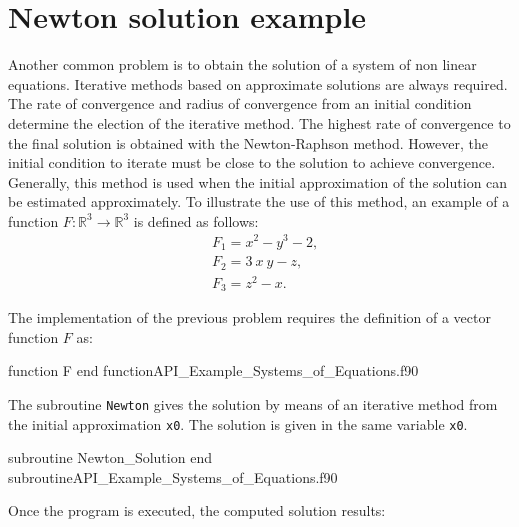     

    
\section{Newton solution example} 
    
    Another common problem is to obtain the solution of a system of  non linear equations. 
    Iterative methods based on approximate solutions are always required. The rate of convergence and radius of convergence from an initial condition determine the election of the iterative method. The highest rate of convergence to the final solution is obtained with the Newton-Raphson method. However, the initial condition to iterate must be  close to the solution to achieve convergence. Generally, this method is used when the initial approximation of the  solution can be estimated approximately. 
     To illustrate the use of this method,  an example of a  function ${F}:\mathbb{R}^3 \rightarrow \mathbb{R}^3$ is defined as follows:
    \begin{align*}
    &	F_1 = x^2 - y^3 - 2,\\
    &   F_2 = 3 \ x \ y - z,\\
    &   F_3 = z^2 -x.
    \end{align*}
    
    The implementation of the previous problem requires the definition of a vector function $F$ as:
   
    \vspace{0.5cm} 
    {function F}
    {end function}{API_Example_Systems_of_Equations.f90}
    
    The subroutine \verb|Newton|  gives the solution by means of an iterative method from the  initial approximation \verb|x0|.
    The solution is given in the same variable  \verb|x0|. 

    
    \vspace{0.5cm} 
    {subroutine Newton_Solution}
    {end subroutine}{API_Example_Systems_of_Equations.f90}
    
    Once the program is executed, the computed solution results:
    
